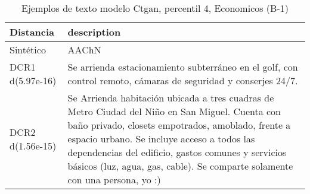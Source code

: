 \begin{table}[H]
\centering
\fontsize{10}{14}\selectfont
\caption{Ejemplos de texto modelo Ctgan, percentil 4, Economicos (B-1)}
\label{table-example-economicos-b-1-ctgan-4p-text}
\begin{tabular}{|l|m{35em}|}
\hline
\rowcolor[gray]{0.8}
Distancia & description \\
\hline Sintético & AAChN \\
\hline DCR1 d(5.97e-16) & Se arrienda estacionamiento subterr\'aneo en el golf, con control remoto, c\'amaras de seguridad y conserjes 24/7. \\
\hline DCR2 d(1.56e-15) & Se Arrienda habitaci\'on ubicada a tres cuadras de Metro Ciudad del Ni\~no en San Miguel. Cuenta con ba\~no privado,  closets empotrados, amoblado, frente a espacio urbano. Se incluye acceso a todos las dependencias del edificio, gastos comunes y servicios b\'asicos (luz, agua, gas, cable). Se comparte solamente con una persona, yo :) \\
\hline
\end{tabular}
\end{table}
